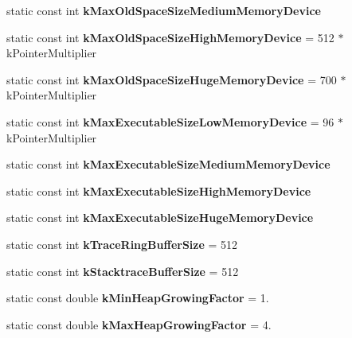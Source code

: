 \begin{DoxyCompactItemize}
\item 
static const int {\bfseries k\+Max\+Old\+Space\+Size\+Medium\+Memory\+Device}
\item 
static const int {\bfseries k\+Max\+Old\+Space\+Size\+High\+Memory\+Device} = 512 $\ast$ k\+Pointer\+Multiplier\hypertarget{classv8_1_1internal_1_1_heap_a4c74488a8043a14e7959a0c4b91dde36}{}\label{classv8_1_1internal_1_1_heap_a4c74488a8043a14e7959a0c4b91dde36}

\item 
static const int {\bfseries k\+Max\+Old\+Space\+Size\+Huge\+Memory\+Device} = 700 $\ast$ k\+Pointer\+Multiplier\hypertarget{classv8_1_1internal_1_1_heap_ac84f2b21117c20a26fe4706ad5b2f9bd}{}\label{classv8_1_1internal_1_1_heap_ac84f2b21117c20a26fe4706ad5b2f9bd}

\item 
static const int {\bfseries k\+Max\+Executable\+Size\+Low\+Memory\+Device} = 96 $\ast$ k\+Pointer\+Multiplier\hypertarget{classv8_1_1internal_1_1_heap_ae0868099058047cc0a16a90f365345f9}{}\label{classv8_1_1internal_1_1_heap_ae0868099058047cc0a16a90f365345f9}

\item 
static const int {\bfseries k\+Max\+Executable\+Size\+Medium\+Memory\+Device}
\item 
static const int {\bfseries k\+Max\+Executable\+Size\+High\+Memory\+Device}
\item 
static const int {\bfseries k\+Max\+Executable\+Size\+Huge\+Memory\+Device}
\item 
static const int {\bfseries k\+Trace\+Ring\+Buffer\+Size} = 512\hypertarget{classv8_1_1internal_1_1_heap_a90e80e6badeb4b3c1e6d2ae51b00a064}{}\label{classv8_1_1internal_1_1_heap_a90e80e6badeb4b3c1e6d2ae51b00a064}

\item 
static const int {\bfseries k\+Stacktrace\+Buffer\+Size} = 512\hypertarget{classv8_1_1internal_1_1_heap_a7f001c17ec007b810c5dbf8f073bf291}{}\label{classv8_1_1internal_1_1_heap_a7f001c17ec007b810c5dbf8f073bf291}

\item 
static const double {\bfseries k\+Min\+Heap\+Growing\+Factor} = 1.\hypertarget{classv8_1_1internal_1_1_heap_af535ad299975c5f1e9f57c1dd301f936}{}\label{classv8_1_1internal_1_1_heap_af535ad299975c5f1e9f57c1dd301f936}

\item 
static const double {\bfseries k\+Max\+Heap\+Growing\+Factor} = 4.\hypertarget{classv8_1_1internal_1_1_heap_ab9f44d04e5dbd521ab909f362ba9b6a4}{}\label{classv8_1_1internal_1_1_heap_ab9f44d04e5dbd521ab909f362ba9b6a4}


\end{DoxyCompactItemize}
